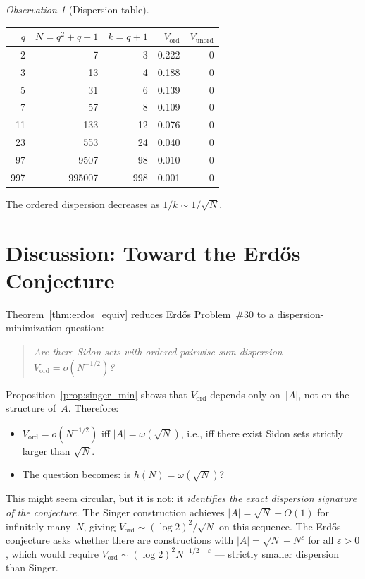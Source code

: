 \documentclass[11pt]{amsart}
\theoremstyle{plain}
\theoremstyle{definition}
\theoremstyle{remark}
\newtheorem{observation}[theorem]{Observation}
\begin{document}
\begin{observation}[Dispersion table]
\begin{center}
\begin{tabular}{rrrrr}
\toprule
$q$ & $N = q^2+q+1$ & $k = q+1$ & $V_{\mathrm{ord}}$ & $V_{\mathrm{unord}}$ \\
\midrule
2   & 7       & 3   & 0.222 & 0 \\
3   & 13      & 4   & 0.188 & 0 \\
5   & 31      & 6   & 0.139 & 0 \\
7   & 57      & 8   & 0.109 & 0 \\
11  & 133     & 12  & 0.076 & 0 \\
23  & 553     & 24  & 0.040 & 0 \\
97  & 9507    & 98  & 0.010 & 0 \\
997 & 995007  & 998 & 0.001 & 0 \\
\bottomrule
\end{tabular}
\end{center}
The ordered dispersion decreases as $1/k \sim 1/\sqrt{N}$.
\end{observation}

\section{Discussion: Toward the Erd\H{o}s Conjecture}

Theorem~\ref{thm:erdos_equiv} reduces Erd\H{o}s Problem~\#30 to a
dispersion-minimization question:
\begin{quote}
\emph{Are there Sidon sets with ordered pairwise-sum dispersion
$V_{\mathrm{ord}} = o(N^{-1/2})$?}
\end{quote}

Proposition~\ref{prop:singer_min} shows that $V_{\mathrm{ord}}$ depends only
on~$|A|$, not on the structure of~$A$.  Therefore:
\begin{itemize}
\item $V_{\mathrm{ord}} = o(N^{-1/2})$ iff $|A| = \omega(\sqrt{N})$, i.e.,
  iff there exist Sidon sets strictly larger than $\sqrt{N}$.
\item The question becomes: is $h(N) = \omega(\sqrt{N})$?
\end{itemize}

This might seem circular, but it is not: it \emph{identifies the exact
dispersion signature of the conjecture}.  The Singer construction achieves
$|A| = \sqrt{N} + O(1)$ for infinitely many~$N$, giving $V_{\mathrm{ord}}
\sim (\log 2)^2/\sqrt{N}$ on this sequence.  The Erd\H{o}s conjecture asks
whether there are constructions with $|A| = \sqrt{N} + N^\varepsilon$ for all
$\varepsilon > 0$, which would require $V_{\mathrm{ord}} \sim (\log 2)^2 N^{-1/2-\varepsilon}$
--- strictly smaller dispersion than Singer.
\end{document}
